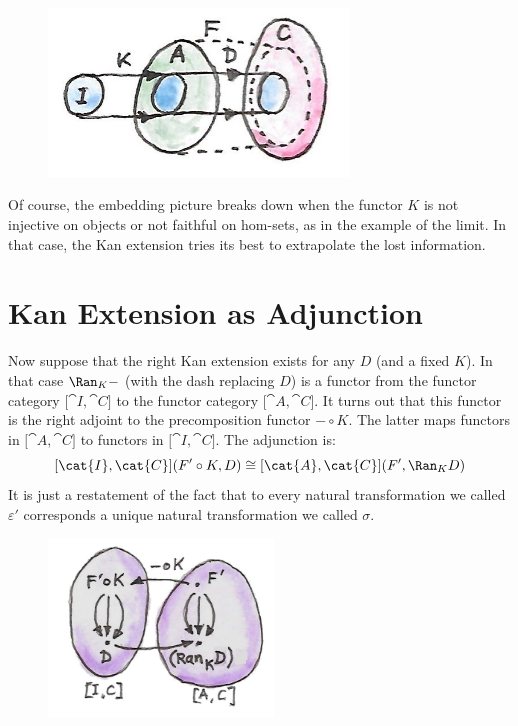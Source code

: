 \begin{figure}[H]
\centering
\includegraphics[width=80mm]{images/kan6.jpg}
\end{figure}

\noindent
Of course, the embedding picture breaks down when the functor $K$
is not injective on objects or not faithful on hom-sets, as in the
example of the limit. In that case, the Kan extension tries its best to
extrapolate the lost information.

\section{Kan Extension as Adjunction}

Now suppose that the right Kan extension exists for any $D$ (and
a fixed $K$). In that case $\Ran_{K}-$ (with the dash
replacing $D$) is a functor from the functor category
${[}\cat{I}, \cat{C}{]}$ to the functor category ${[}\cat{A}, \cat{C}{]}$. It
turns out that this functor is the right adjoint to the precomposition
functor $- \circ K$. The latter maps functors in ${[}\cat{A}, \cat{C}{]}$
to functors in ${[}\cat{I}, \cat{C}{]}$. The adjunction is:
\[[\cat{I}, \cat{C}](F' \circ K, D) \cong [\cat{A}, \cat{C}](F', \Ran_{K}D)\]
It is just a restatement of the fact that to every natural
transformation we called $\varepsilon'$ corresponds a unique natural
transformation we called $\sigma$.

\begin{figure}[H]
\centering
\includegraphics[width=60mm]{images/kan92.jpg}
\end{figure}

